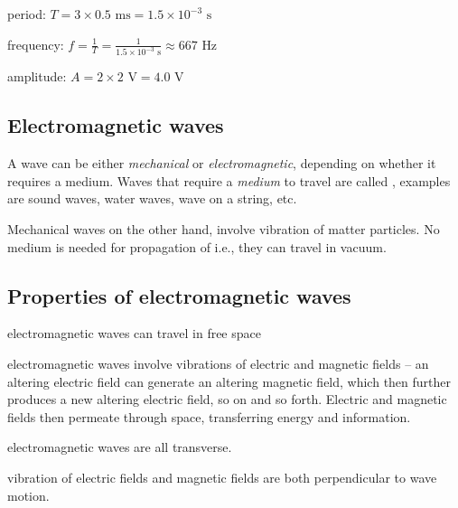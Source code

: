 
\begin{soln} period: $T = 3 \times 0.5 \text{ ms} = 1.5 \times10^{-3} \text{ s}$

\eqyskip frequency: $f = \frac{1}{T} = \frac{1}{1.5 \times10^{-3} \text{ s}} \approx 667 \text{ Hz}$

\eqyskip amplitude: $A = 2 \times 2 \text{ V} = 4.0 \text{ V}$ \end{soln}


\subsection{Electromagnetic waves}

A wave can be either \emph{mechanical} or \emph{electromagnetic}, depending on whether it requires a medium. Waves that require a \emph{medium} to travel are called , examples are sound waves, water waves, wave on a string, etc.

Mechanical waves on the other hand, involve vibration of matter particles. No medium is needed for propagation of  i.e., they can travel in vacuum.

\subsection{Properties of electromagnetic waves}

\titem electromagnetic waves can travel in free space

\titem electromagnetic waves involve vibrations of electric and magnetic fields -- an altering electric field can generate an altering magnetic field, which then further produces a new altering electric field, so on and so forth. Electric and magnetic fields then permeate through space, transferring energy and information.
	
\titem electromagnetic waves are all transverse.
	
\titem vibration of electric fields and magnetic fields are both perpendicular to wave motion.

